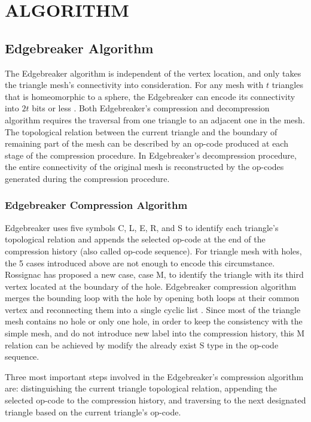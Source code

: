 \documentclass[onecolumn, 12pt]{article}
\begin{document}
\section{ALGORITHM} \label{sec:algorithm}
\subsection{Edgebreaker Algorithm}
The Edgebreaker algorithm is independent of the vertex location, and only takes the triangle mesh's connectivity into consideration. For any mesh with $t$ triangles that is homeomorphic to a sphere, the Edgebreaker can encode its connectivity into $2t$ bits or less \cite{Edgebreaker}. Both Edgebreaker's compression and decompression algorithm requires the traversal from one triangle to an adjacent one in the mesh. The topological relation between the current triangle and the boundary of remaining part of the mesh can be described by an op-code produced at each stage of the compression procedure. In Edgebreaker's decompression procedure, the entire connectivity of the original mesh is reconstructed by the op-codes generated during the compression procedure.

\subsubsection{Edgebreaker Compression Algorithm}
Edgebreaker uses five symbols C, L, E, R, and S to identify each triangle's topological relation and appends the selected op-code at the end of the compression history (also called op-code sequence). For triangle mesh with holes, the 5 cases introduced above are not enough to encode this circumstance. Rossignac has proposed a new case, case M, to identify the triangle with its third vertex located at the boundary of the hole. Edgebreaker compression algorithm merges the bounding loop with the hole by opening both loops at their common vertex and reconnecting them into a single cyclic list \cite{Edgebreaker}. Since most of the triangle mesh contains no hole or only one hole, in order to keep the consistency with the simple mesh, and do not introduce new label into the compression history, this M relation can be achieved by modify the already exist S type in the op-code sequence.

Three most important steps involved in the Edgebreaker's compression algorithm are: distinguishing the current triangle topological relation, appending the selected op-code to the compression history, and traversing to the next designated triangle based on the current triangle's op-code.
\end{document}
